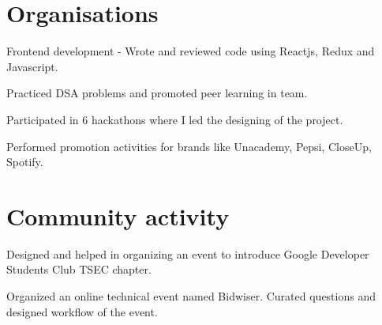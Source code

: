\begin{minipage}[t]{0.66\textwidth} 


\section{Organisations}

\vspace{\topsep} %
\begin{tightemize}
\item Frontend development - Wrote and reviewed code using Reactjs, Redux and Javascript.
\item Practiced DSA problems and promoted peer learning in team. 
\item Participated in 6 hackathons where I led the designing of the project.
\end{tightemize}
\sectionsep

\begin{tightemize}
\item Performed promotion activities for brands like Unacademy, Pepsi, CloseUp, Spotify.
\end{tightemize}
\sectionsep


\section{Community activity}

\begin{tightemize}
\item Designed and helped in organizing an event to introduce Google Developer Students Club TSEC chapter.
\end{tightemize}
\sectionsep

\begin{tightemize}
\item Organized an online technical event named Bidwiser. Curated questions and designed workflow of the event.
\end{tightemize}
\sectionsep


\end{minipage}
